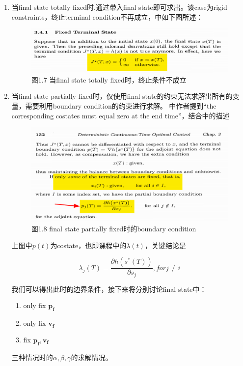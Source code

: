 \documentclass[40pt,a4paper,UTF8]{ctexart}
\numberwithin{equation}{section}
\begin{document}
\begin{enumerate}
\item 当final state totally fixed时,通过带入final state即可求出。该case为rigid constraints，终止terminal condition不再成立，\cite{ref2}中如下图所述：
\begin{figure}[H]
    \centering
    \includegraphics[width=4.8in]{ch4_7.png} {图1.7 当final state totally fixed时，终止条件不成立}
\end{figure}

\item 当final state partially fixed时，仅使用final state的约束无法求解出所有的变量，需要利用boundary condition的约束进行求解。
\cite{ref1}中作者提到“the corresponding costates must equal zero at the end time”，结合\cite{ref2}中的描述
\begin{figure}[H]
    \centering
    \includegraphics[width=4.8in]{ch4_8.png} {图1.8 final state partially fixed时的boundary condition}
\end{figure}
上图中$p(t)$为costate，也即课程中的$\lambda (t)$，关键结论是

\begin{equation}
    \lambda_j(T)=\frac{\partial{h(s^*(T))}}{\partial{s_j}},for j\neq i
\end{equation}

我们可以得出此时的边界条件，接下来将分别讨论final state中：
\begin{enumerate}
\item only fix $\bm{p_f}$
\item only fix $\bm{v_f}$
\item fix $\bm{p_f, v_f}$
\end{enumerate}
三种情况时的$\alpha,\beta,\gamma$的求解情况。


\end{enumerate}
\end{document}
